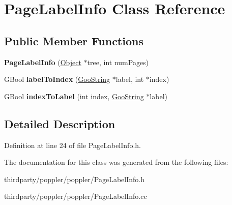 \hypertarget{class_page_label_info}{}\section{Page\+Label\+Info Class Reference}
\label{class_page_label_info}
\subsection*{Public Member Functions}
\begin{DoxyCompactItemize}
\item 
\mbox{\label{class_page_label_info_aac6fab9ebc6f11bd1444412e99e15f80}} 
{\bfseries Page\+Label\+Info} (\hyperlink{class_object}{Object} $\ast$tree, int num\+Pages)
\item 
\mbox{\label{class_page_label_info_a27aceb9be56acd4b1911668165ad49d3}} 
G\+Bool {\bfseries label\+To\+Index} (\hyperlink{class_goo_string}{Goo\+String} $\ast$label, int $\ast$index)
\item 
\mbox{\label{class_page_label_info_a18e9b83cd5b2b602232fc77f3f11d890}} 
G\+Bool {\bfseries index\+To\+Label} (int index, \hyperlink{class_goo_string}{Goo\+String} $\ast$label)
\end{DoxyCompactItemize}


\subsection{Detailed Description}


Definition at line 24 of file Page\+Label\+Info.\+h.



The documentation for this class was generated from the following files\+:\begin{DoxyCompactItemize}
\item 
thirdparty/poppler/poppler/Page\+Label\+Info.\+h\item 
thirdparty/poppler/poppler/Page\+Label\+Info.\+cc\end{DoxyCompactItemize}
